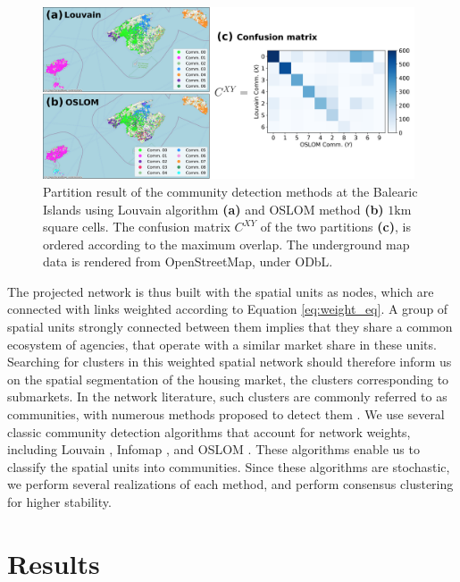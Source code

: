 \begin{figure}
    \centering
    \includegraphics[width = 0.98\textwidth]{Figs/Idealista_segmentation/agreement_method.pdf}
	\caption[Agreement between different partitions.]{ Partition result of the community detection methods at the Balearic Islands using Louvain algorithm \textbf{(a)} and OSLOM method \textbf{(b)} $1 \textrm{km}$ square cells. The confusion matrix $C^{XY}$ of the two partitions \textbf{(c)}, is ordered according to the maximum overlap. The underground map data is rendered from OpenStreetMap, under ODbL. \label{fig:agreement_method}}
\end{figure}

The projected network is thus built with the spatial units as nodes, which are connected with links weighted according to Equation \ref{eq:weight_eq}. A group of spatial units strongly connected between them implies that they share a common ecosystem of agencies, that operate with a similar market share in these units.
Searching for clusters in this weighted spatial network should therefore inform us on the spatial segmentation of the housing market, the clusters corresponding to submarkets. In the network literature, such clusters are commonly referred to as communities, with numerous methods proposed to detect them \cite{fortunato2010community}. We use several classic community detection algorithms \cite{newman2004finding,infomap,Louvain,Louvain-Leiden,OSLOM} that account for network weights, including Louvain \cite{Louvain-Leiden}, Infomap \cite{infomap}, and OSLOM \cite{OSLOM}. These algorithms enable us to classify the spatial units into communities. Since these algorithms are stochastic, we perform several realizations of each method, and perform consensus clustering \cite{lancichinetti2012consensus} for higher stability.

\section{Results}
\label{sec:results}

